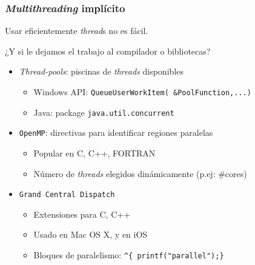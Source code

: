 \documentclass[letter]{beamer}
\begin{document}
\begin{frame}[fragile]
  \frametitle{{\em Multithreading} implícito}

  Usar eficientemente {\em thread}s no es fácil.
  
  ¿Y si le dejamos el trabajo al compilador o bibliotecas?
  
  \begin{itemize}
    \item {\em Thread-pools}: piscinas de {\em threads} disponibles
      \begin{itemize}
        \item Windows API: {\tt QueueUserWorkItem( \&PoolFunction,...)}
        \item Java: package {\tt java.util.concurrent}
      \end{itemize}
    \item {\tt OpenMP}: directivas para identificar regiones paralelas
      \begin{itemize}
        \item Popular en C, C++, FORTRAN
        \item Número de {\em threads} elegidos dinámicamente (p.ej: $\#$cores)
      \end{itemize}
    \item {\tt Grand Central Dispatch}
      \begin{itemize}
        \item Extensiones para C, C++
        \item Usado en Mac OS X, y en iOS
        \item Bloques de paralelismo: \verb+^{ printf("parallel");}+
      \end{itemize}
  \end{itemize}

\end{frame}
\end{document}
